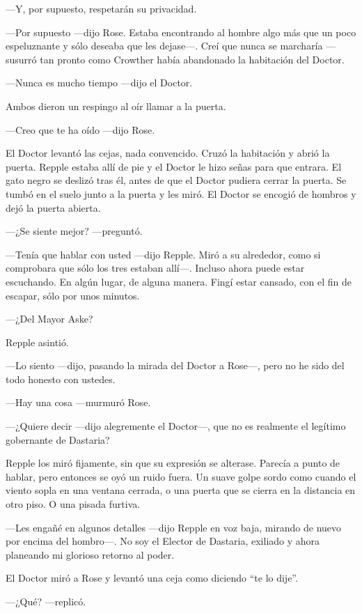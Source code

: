 {---Y, por supuesto, respetarán su privacidad.}

{---Por supuesto ---dijo Rose. Estaba encontrando al hombre algo más que
	un poco espeluznante y sólo deseaba que les dejase---. Creí que nunca se
	marcharía ---susurró tan pronto como Crowther había abandonado la
habitación del Doctor.}

{---Nunca es mucho tiempo ---dijo el Doctor.}

{Ambos dieron un respingo al oír llamar a la puerta.}

{---Creo que te ha oído ---dijo Rose.}

{El Doctor levantó las cejas, nada convencido. Cruzó la habitación y
	abrió la puerta. Repple estaba allí de pie y el Doctor le hizo señas
	para que entrara. El gato negro se deslizó tras él, antes de que el
	Doctor pudiera cerrar la puerta. Se tumbó en el suelo junto a la puerta
y les miró. El Doctor se encogió de hombros y dejó la puerta abierta.}

{---¿Se siente mejor? ---preguntó.}

{---Tenía que hablar con usted ---dijo Repple. Miró a su alrededor, como
	si comprobara que sólo los tres estaban allí---. Incluso ahora puede
	estar escuchando. En algún lugar, de alguna manera. Fingí estar cansado,
con el fin de escapar, sólo por unos minutos.}

{---¿Del Mayor Aske?}

{Repple asintió.}

{---Lo siento ---dijo, pasando la mirada del Doctor a Rose---, pero no
he sido del todo honesto con ustedes.}

{---Hay una cosa ---murmuró Rose.}

{---¿Quiere decir ---dijo alegremente el Doctor---, que no es realmente
el legítimo gobernante de Dastaria?}

{Repple los miró fijamente, sin que su expresión se alterase. Parecía a
	punto de hablar, pero entonces se oyó un ruido fuera. Un suave golpe
	sordo como cuando el viento sopla en una ventana cerrada, o una puerta
que se cierra en la distancia en otro piso. O una pisada furtiva.}

{---Les engañé en algunos detalles ---dijo Repple en voz baja, mirando
	de nuevo por encima del hombro---. No soy el Elector de Dastaria,
exiliado y ahora planeando mi glorioso retorno al poder.}

{El Doctor miró a Rose y levantó una ceja como diciendo ``te lo dije''.}

{---¿Qué? ---replicó.}

